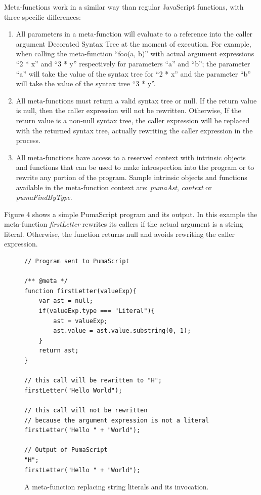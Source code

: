 \documentclass[preprint,10pt]{sigplanconf}
\begin{document}
Meta-functions work in a similar way than regular JavaScript functions, with three specific differences:

\begin{enumerate}
  \item All parameters in a meta-function will evaluate to a reference into the caller argument Decorated Syntax Tree at the moment of execution. 
For example, when calling the meta-function ``foo(a, b)'' with actual argument expressions ``2 * x'' and ``3 * y'' respectively for parameters ``a'' and ``b''; the parameter ``a'' will take the value of the syntax tree for ``2 * x'' and the parameter ``b'' will take the value of the syntax tree ``3 * y''.
  \item All meta-functions must return a valid syntax tree or null. If the return value is null, then the caller expression will not be rewritten. Otherwise, If the return value is a non-null syntax tree, the caller expression will be replaced with the returned syntax tree, actually rewriting the caller expression in the process.
  \item All meta-functions have access to a reserved context with intrinsic objects and functions that can be used to make introspection into the program or to rewrite any portion of the program. Sample intrinsic objects and functions available in the meta-function context are: \emph{pumaAst}, \emph{context} or \emph{pumaFindByType}.
\end{enumerate}

Figure 4 shows a simple PumaScript program and its output. In this example the meta-function \emph{firstLetter} rewrites its callers if the actual argument is a string literal. Otherwise, the function returns null and avoids rewriting the caller expression.

\begin{figure}
\begin{lstlisting}
// Program sent to PumaScript

/** @meta */ 
function firstLetter(valueExp){
    var ast = null;
    if(valueExp.type === "Literal"){
        ast = valueExp;
        ast.value = ast.value.substring(0, 1);
    }
    return ast;
}

// this call will be rewritten to "H";
firstLetter("Hello World"); 

// this call will not be rewritten 
// because the argument expression is not a literal
firstLetter("Hello " + "World");

// Output of PumaScript
"H";
firstLetter("Hello " + "World");
\end{lstlisting}
\caption{A meta-function replacing string literals and its invocation.}
\label{fig:4}
\end{figure}
\end{document}
